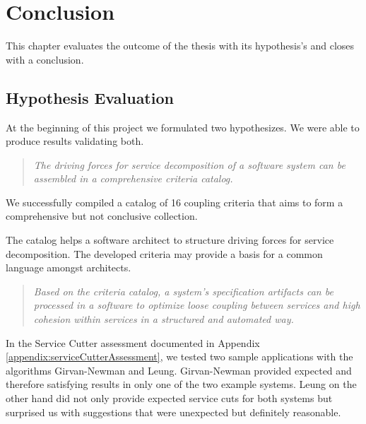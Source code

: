 \chapter{Conclusion}

This chapter evaluates the outcome of the thesis with its hypothesis's and closes with a conclusion.

\section{Hypothesis Evaluation}

At the beginning of this project we formulated two hypothesizes. We were able to produce results validating both.

\begin{quote}
	\textit{The driving forces for service decomposition of a software system can be assembled in a comprehensive criteria catalog.}
\end{quote}

We successfully compiled a catalog of 16 coupling criteria that aims to form a comprehensive but not conclusive collection. 

The catalog helps a software architect to structure driving forces for service decomposition. The developed criteria may provide a basis for a common language amongst architects. 


\begin{quote}
	\textit{Based on the criteria catalog, a system's specification artifacts can be processed in a software to optimize loose coupling between services and high cohesion within services in a structured and automated way.}
\end{quote}

In the Service Cutter assessment documented in Appendix \ref{appendix:serviceCutterAssessment}, we tested two sample applications with the algorithms Girvan-Newman and Leung. Girvan-Newman provided expected and therefore satisfying results in only one of the two example systems. Leung on the other hand did not only provide expected service cuts for both systems but surprised us with suggestions that were unexpected but definitely reasonable.  

